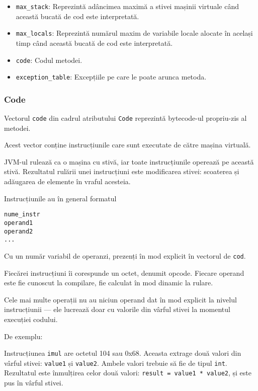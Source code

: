 \begin{itemize}
	\tightlist
	\item
	      \texttt{max\_stack}: Reprezintă adâncimea maximă a stivei mașinii
	      virtuale când această bucată de cod este interpretată.
	\item
	      \texttt{max\_locals}: Reprezintă numărul maxim de variabile locale
	      alocate în același timp când această bucată de cod este interpretată.
	\item
	      \texttt{code}: Codul metodei.
	\item
	      \texttt{exception\_table}: Excepțiile pe care le poate arunca metoda.
\end{itemize}

\subsubsection{Code}

Vectorul \texttt{code} din cadrul atributului \texttt{Code} reprezintă
bytecode-ul propriu-zis al metodei.

Acest vector conține instrucțiunile care sunt executate de către mașina
virtuală.

JVM-ul rulează ca o mașina cu stivă, iar toate instrucțiunile operează
pe această stivă. Rezultatul rulării unei instrucțiuni este modificarea
stivei: scoaterea și adăugarea de elemente în vraful acesteia.

Instrucțiunile au în general formatul~\cite{instruction_format}

\begin{verbatim}
nume_instr
operand1
operand2
...
\end{verbatim}

Cu un număr variabil de operanzi, prezenți în mod explicit în vectorul
de \texttt{cod}.

Fiecărei instrucțiuni îi corespunde un octet, denumit opcode. Fiecare
operand este fie cunoscut la compilare, fie calculat în mod dinamic la
rulare.

Cele mai multe operații nu au niciun operand dat în mod explicit la
nivelul instrucțiunii --- ele lucrează doar cu valorile din vârful stivei
la momentul execuției codului.

De exemplu:

Instrucțiunea \texttt{imul} are octetul 104 sau 0x68.
Aceasta extrage două valori din vârful stivei: \texttt{value1} și
\texttt{value2}. Ambele valori trebuie să fie de tipul \texttt{int}.
Rezultatul este înmulțirea celor două valori:
\texttt{result\ =\ value1\ *\ value2}, și este pus în vârful stivei.

